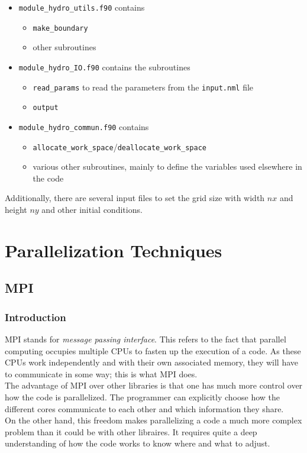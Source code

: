 \documentclass[12pt, a4paper, titlepage]{article}
\newcounter{def}
\begin{document}
{\begin{itemize}
\begin{itemize}
\begin{itemize}
		\end{itemize}
	\end{itemize}
	\item \texttt{module\_hydro\_utils.f90} contains
	\begin{itemize}
		\item \texttt{make\_boundary}
		\item other subroutines
	\end{itemize}
	\item \texttt{module\_hydro\_IO.f90} contains the subroutines
	\begin{itemize}
		\item \texttt{read\_params} to read the parameters from the \texttt{input.nml} file
		\item \texttt{output}
	\end{itemize}
	\item \texttt{module\_hydro\_commun.f90} contains 
	\begin{itemize}
		\item \texttt{allocate\_work\_space}/\texttt{deallocate\_work\_space}
		\item various other subroutines, mainly to define the variables used elsewhere in the code
	\end{itemize}		
\end{itemize}

Additionally, there are several input files to set the grid size with width $nx$ and height $ny$ and other initial conditions.








\section{Parallelization Techniques}
\subsection{MPI}

\subsubsection{Introduction}
MPI stands for \textit{message passing interface}. This refers to the fact that parallel computing occupies multiple CPUs to fasten up the execution of a code. As these CPUs work independently and with their own associated memory, they will have to communicate in some way; this is what MPI does.\\
The advantage of MPI over other libraries is that one has much more control over how the code is parallelized. The programmer can explicitly choose how the different cores communicate to each other and which information they share.\\
On the other hand, this freedom makes parallelizing a code a much more complex problem than it could be with other libraires. It requires quite a deep understanding of how the code works to know where and what to adjust.


}
\end{document}
